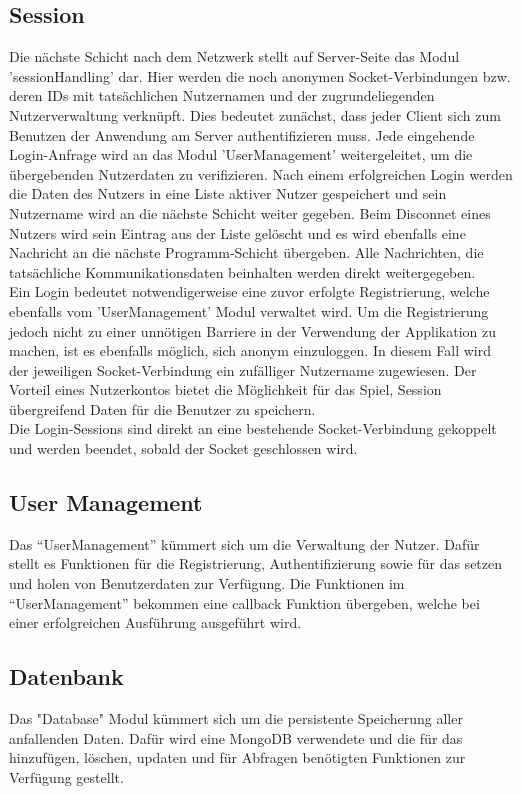 \documentclass[a4paper]{spie}  %
\begin{document}
\subsection{Session}
Die nächste Schicht nach dem Netzwerk stellt auf Server-Seite das Modul 'sessionHandling' dar. Hier werden die noch anonymen Socket-Verbindungen bzw. deren IDs mit tatsächlichen Nutzernamen und der zugrundeliegenden Nutzerverwaltung verknüpft. Dies bedeutet zunächst, dass jeder Client sich zum Benutzen der Anwendung am Server authentifizieren muss. Jede eingehende Login-Anfrage wird an das Modul 'UserManagement' weitergeleitet, um die übergebenden Nutzerdaten zu verifizieren. Nach einem erfolgreichen Login werden die Daten des Nutzers in eine Liste aktiver Nutzer gespeichert und sein Nutzername wird an die nächste Schicht weiter gegeben. Beim Disconnet eines Nutzers wird sein Eintrag aus der Liste gelöscht und es wird ebenfalls eine Nachricht an die nächste Programm-Schicht übergeben. Alle Nachrichten, die tatsächliche Kommunikationsdaten beinhalten werden direkt weitergegeben.\\
Ein Login bedeutet notwendigerweise eine zuvor erfolgte Registrierung, welche ebenfalls vom 'UserManagement' Modul verwaltet wird. Um die Registrierung jedoch nicht zu einer unnötigen Barriere in der Verwendung der Applikation zu machen, ist es ebenfalls möglich, sich anonym einzuloggen. In diesem Fall wird der jeweiligen Socket-Verbindung ein zufälliger Nutzername zugewiesen. Der Vorteil eines Nutzerkontos bietet die Möglichkeit für das Spiel, Session übergreifend Daten für die Benutzer zu speichern.\\
Die Login-Sessions sind direkt an eine bestehende Socket-Verbindung gekoppelt und werden beendet, sobald der Socket geschlossen wird.
\subsection{User Management}
Das \enquote{UserManagement} kümmert sich um die Verwaltung der Nutzer. Dafür stellt es Funktionen für die Registrierung, Authentifizierung sowie für das setzen und holen von Benutzerdaten zur Verfügung. Die Funktionen im \enquote{UserManagement} bekommen eine callback Funktion übergeben, welche bei einer erfolgreichen Ausführung ausgeführt wird.

\subsection{Datenbank}
Das "Database" Modul kümmert sich um die persistente Speicherung aller anfallenden Daten. Dafür wird eine MongoDB verwendete und die für das hinzufügen, löschen, updaten und für Abfragen benötigten Funktionen zur Verfügung gestellt.
\end{document}
